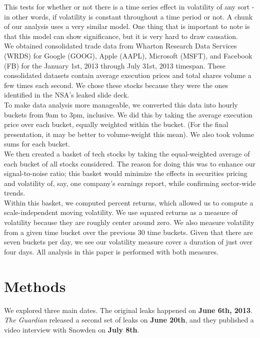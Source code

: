 \documentclass[11pt]{amsart}
\begin{document}
This tests for whether or not there is a time series effect in volatility of any sort - in other words, if volatility is constant throughout a time period or not. A chunk of our analysis uses a very similar model. One thing that is important to note is that this model can show significance, but it is very hard to draw causation. \\

We obtained consolidated trade data from Wharton Research Data Services (WRDS) for Google (GOOG), Apple (AAPL), Microsoft (MSFT), and Facebook (FB) for the January 1st, 2013 through July 31st, 2013 timespan. These consolidated datasets contain average execution prices and total shares volume a few times each second. We chose these stocks because they were the ones identified in the NSA's leaked slide deck. \\

To make data analysis more manageable, we converted this data into hourly buckets from 9am to 3pm, inclusive. We did this by taking the average execution price over each bucket, equally weighted within the bucket. (For the final presentation, it may be better to volume-weight this mean). We also took volume sums for each bucket. \\

We then created a basket of tech stocks by taking the equal-weighted average of each bucket of all stocks considered. The reason for doing this was to enhance our signal-to-noise ratio; this basket would minimize the effects in securities pricing and volatility of, say, one company's earnings report, while confirming sector-wide trends. \\

Within this basket, we computed percent returns, which allowed us to compute a scale-independent moving volatility. We use squared returns as a measure of volatility because they are roughly center around zero. We also measure volatility from a given time bucket over the previous 30 time buckets. Given that there are seven buckets per day, we see our volatility measure cover a duration of just over four days. All analysis in this paper is performed with both measures. \\

\section{Methods}
We explored three main dates. The original leaks happened on \textbf{June 6th, 2013}. \textit{The Guardian} released a second set of leaks on \textbf{June 20th}, and they published a video interview with Snowden on \textbf{July 8th}. \\
\end{document}
